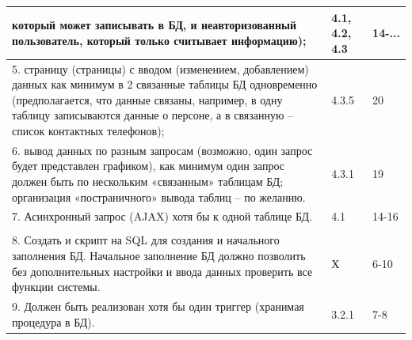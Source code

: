 \documentclass[a4paper,12pt]{article}
\begin{document}
\begin{longtable}{|p{7cm}|p{3cm}|p{3cm}|}
    который может записывать в БД, и неавторизованный пользователь, который только считывает информацию); & 4.1, 4.2, 4.3                        & 14-...                                                                                  \\
    \hline
    5. страницу (страницы) с вводом (изменением, добавлением)
    данных как минимум в 2 связанные таблицы БД одновременно
    (предполагается, что данные связаны, например, в одну таблицу записываются данные о персоне,
    а в связанную – список контактных телефонов);                                                         & 4.3.5                                & 20                                                                                      \\
    \hline
    6. вывод данных по разным запросам (возможно, один запрос будет представлен графиком),
    как минимум один запрос должен быть по нескольким «связанным» таблицам БД;
    организация «постраничного» вывода таблиц – по желанию.                                               & 4.3.1                                & 19                                                                                      \\
    \hline
    7. Асинхронный запрос (AJAX) хотя бы к одной таблице БД.                                              & 4.1                                  & 14-16                                                                                   \\                                                                                                                                                                                                                                                                        &                                      &                                                                                         \\
    \hline
    8. Создать и скрипт на SQL для создания и начального заполнения БД.
    Начальное заполнение БД должно позволить без дополнительных настройки
    и ввода данных проверить все функции системы.                                                         & Х                                    & 6-10                                                                                    \\
    \hline
    9. Должен быть реализован хотя бы один триггер (хранимая процедура в БД).                             & 3.2.1                                & 7-8                                                                                     \\

\end{longtable}
\end{document}
